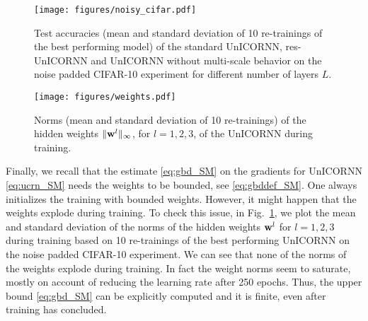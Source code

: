 \documentclass{article}
\newcommand{\bw}{{\bf w}}
\newcommand{\fref}[1] {Fig.~\ref{#1}}
\begin{document}
\begin{figure}[ht!]
\centering
\begin{minipage}[t]{.48\textwidth}
\texttt{[image: figures/noisy\_cifar.pdf]}
\caption{Test accuracies (mean and standard deviation of 10 re-trainings of the best performing model) of the standard UnICORNN, res-UnICORNN and UnICORNN without multi-scale behavior on the noise padded CIFAR-10 experiment for different number of layers $L$.}
\label{fig:cifar}
\end{minipage}\hspace{0.01\textwidth}
\begin{minipage}[t]{.48\textwidth}
\texttt{[image: figures/weights.pdf]}
\caption{Norms (mean and standard deviation of 10 re-trainings) of the hidden weights $\|\bw^l\|_\infty$, for $l=1,2,3$, of the UnICORNN during training.}
\label{fig:weights}
\end{minipage}
\end{figure}

Finally, we recall that the estimate \eqref{eq:gbd_SM} on the gradients for UnICORNN \eqref{eq:ucrn_SM} needs the weights to be bounded, see \eqref{eq:gbddef_SM}. One always initializes the training with bounded weights. However, it might happen that the weights explode during training. To check this issue, in  \fref{fig:weights}, we plot the mean and standard deviation of the norms of the hidden weights $\bw^l$ for $l=1,2,3$ during training based on 10 re-trainings of the best performing UnICORNN on the noise padded CIFAR-10 experiment. We can see that none of the norms of the weights explode during training. In fact the weight norms seem to saturate, mostly on account of reducing the learning rate after 250 epochs. Thus, the upper bound \eqref{eq:gbd_SM} can be explicitly computed and it is finite, even after training has concluded.
\end{document}
